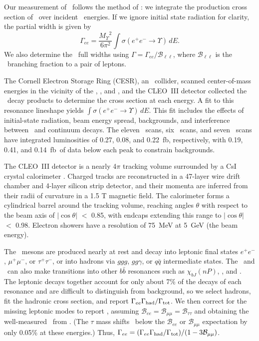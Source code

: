 \documentclass[aps,prl,twocolumn,superscriptaddress,showpacs,floatfix]{revtex4}
\begin{document}
Our measurement of \gee\ follows the method of \cite{pdg}: we
integrate the production cross section of \ups\ over incident \ee\
energies.  If we ignore initial state radiation for clarity, the
partial width is given by
\begin{equation}
\label{eqn:gee}
\Gamma_{ee} = \frac{{M_\Upsilon}^2}{6\pi^2}\int \sigma(e^+e^- \to
\Upsilon) \, dE \mbox{.}
\end{equation}
We also determine the \ups\ full widths using $\Gamma =
\Gamma_{ee}/{\mathcal B}_{\ell\ell}$, where ${\mathcal B}_{\ell\ell}$
is the \ups\ branching fraction to a pair of leptons.

The Cornell Electron Storage Ring (CESR), an \ee\ collider, scanned
center-of-mass energies in the vicinity of the \us, \uss, and \usss,
and the CLEO~III detector collected the \ups\ decay products to
determine the cross section at each energy.  A fit to this resonance
lineshape yields $\int \sigma(e^+e^- \to \Upsilon) \, dE$.  This fit
includes the effects of initial-state radiation, beam energy spread,
backgrounds, and interference between \ups\ and continuum decays.  The
eleven \us\ scans, six \uss\ scans, and seven \usss\ scans have
integrated luminosities of 0.27, 0.08, and 0.22~fb\inv, respectively,
with 0.19, 0.41, and 0.14~fb\inv\ of data below each peak to constrain
backgrounds.

The CLEO~III detector is a nearly 4$\pi$ tracking volume surrounded by
a CsI crystal calorimeter \cite{cleoiii} \cite{driii}.  Charged tracks
are reconstructed in a 47-layer wire drift chamber and 4-layer silicon
strip detector, and their momenta are inferred from their radii of
curvature in a 1.5 T magnetic field.  The calorimeter forms a
cylindrical barrel around the tracking volume, reaching angles
$\theta$ with respect to the beam axis of $|\cos\theta|$ $<$ 0.85,
with endcaps extending this range to $|\cos\theta|$ $<$ 0.98.
Electron showers have a resolution of 75~MeV at 5~GeV (the beam
energy).

The \ups\ mesons are produced nearly at rest and decay into leptonic
final states $e^+e^-$, $\mu^+\mu^-$, or $\tau^+\tau^-$, or into
hadrons via $ggg$, $gg\gamma$, or $q\bar{q}$ intermediate states.  The
\uss\ and \usss\ can also make transitions into other $b\bar{b}$
resonances such as $\chi_{bJ}(nP)$, \us, and \uss.  The leptonic
decays together account for only about 7\% of the decays of each
resonance and are difficult to distinguish from background, so we
select hadrons, fit the hadronic cross section, and report
$\Gamma_{ee}\Gamma_{\mbox{\scriptsize had}}/\Gamma_{\mbox{\scriptsize tot}}$.  We then correct for the missing leptonic modes to
report \gee, assuming ${\mathcal B}_{ee} = {\mathcal B}_{\mu\mu} =
{\mathcal B}_{\tau\tau}$ and obtaining the well-measured \bmm\ from
\cite{istvan}.  (The $\tau$ mass shifts \btt\ below the ${\mathcal
B}_{ee}$ or ${\mathcal B}_{\mu\mu}$ expectation by only 0.05\% at
these energies.)  Thus, $\Gamma_{ee} = (\Gamma_{ee}\Gamma_{\mbox{\scriptsize had}}/\Gamma_{\mbox{\scriptsize tot}})/(1 - 3{\mathcal
B}_{\mu\mu})$.
\end{document}
